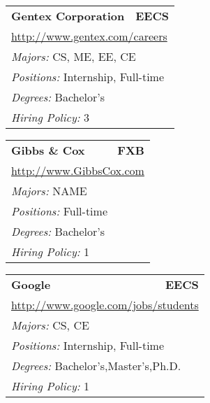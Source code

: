 \documentclass[twoside]{article}
\begin{document}
\begin{center}
\begin{multicols}{3}
\begin{FlushLeft}
\begin{minipage}{.9\columnwidth}
\end{minipage}
 
\begin{minipage}{.9\columnwidth}\begin{tabularx}{.95\columnwidth}{Xr}
                 {\Large\bf Gentex Corporation} & {\Large\bf EECS}\\
    \multicolumn{2}{p{.95\columnwidth}}{\url{http://www.gentex.com/careers}}\\
    \multicolumn{2}{p{.95\columnwidth}}{\emph{Majors:} CS, ME, EE, CE}\\
    \multicolumn{2}{p{.95\columnwidth}}{\emph{Positions:} Internship, Full-time}\\
    \multicolumn{2}{p{.95\columnwidth}}{\emph{Degrees:} Bachelor's}\\
    \multicolumn{2}{p{.95\columnwidth}}{\emph{Hiring Policy:} 3}\\
    \end{tabularx}
    
\end{minipage}
 
\begin{minipage}{.9\columnwidth}\begin{tabularx}{.95\columnwidth}{Xr}
                 {\Large\bf Gibbs \& Cox} & {\Large\bf FXB}\\
    \multicolumn{2}{p{.95\columnwidth}}{\url{http://www.GibbsCox.com}}\\
    \multicolumn{2}{p{.95\columnwidth}}{\emph{Majors:} NAME}\\
    \multicolumn{2}{p{.95\columnwidth}}{\emph{Positions:} Full-time}\\
    \multicolumn{2}{p{.95\columnwidth}}{\emph{Degrees:} Bachelor's}\\
    \multicolumn{2}{p{.95\columnwidth}}{\emph{Hiring Policy:} 1}\\
    \end{tabularx}
    
\end{minipage}
 
\begin{minipage}{.9\columnwidth}\begin{tabularx}{.95\columnwidth}{Xr}
                 {\Large\bf Google} & {\Large\bf EECS}\\
    \multicolumn{2}{p{.95\columnwidth}}{\url{http://www.google.com/jobs/students}}\\
    \multicolumn{2}{p{.95\columnwidth}}{\emph{Majors:} CS, CE}\\
    \multicolumn{2}{p{.95\columnwidth}}{\emph{Positions:} Internship, Full-time}\\
    \multicolumn{2}{p{.95\columnwidth}}{\emph{Degrees:} Bachelor's,Master's,Ph.D.}\\
    \multicolumn{2}{p{.95\columnwidth}}{\emph{Hiring Policy:} 1}\\
    \end{tabularx}
    

\end{minipage}
\end{FlushLeft}
\end{multicols}
\end{center}
\end{document}

